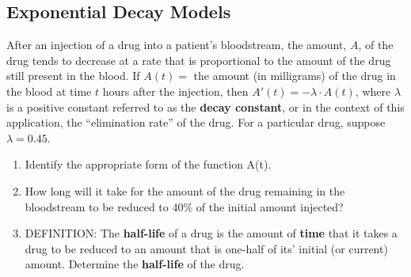 \subsection*{Exponential Decay Models}
\begin{example}
After an injection of a drug into a patient’s bloodstream, the amount, $A$, of the drug tends to decrease at a rate that is proportional to the amount of the drug still present in the blood.  If $A(t)=$ the amount (in milligrams) of the drug in the blood at time $t$ hours after the injection, then $A'(t)=-\lambda\cdot A(t)$, where $\lambda$ is a positive constant referred to as the \textbf{decay constant}, or in the context of this application, the “elimination rate” of the drug.  For a particular drug, suppose $\lambda=0.45$.
\renewcommand{\labelenumi}{\textbf{(\alph{enumi})}}
\begin{enumerate}[leftmargin=*]
\item Identify the appropriate form of the function A(t). 
\item How long will it take for the amount of the drug remaining in the bloodstream to be reduced to 40\% of the initial amount injected?   
\newpage
\item DEFINITION:  The \textbf{half-life} of a drug is the amount of \textbf{time} that it takes a drug to be reduced to an amount that is one-half of its’ initial (or current) amount. Determine the \textbf{half-life} of the drug.\\ 


\end{enumerate}
\end{example}
